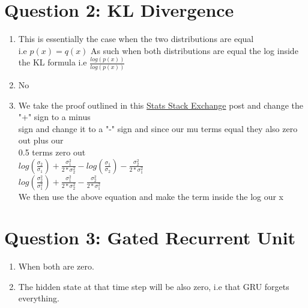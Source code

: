 \documentclass[12pt,letterpaper]{article}
\begin{document}
\section{Question 2: KL Divergence}


\begin{enumerate}

	\item This is essentially the case when the two distributions are equal 
	\\ i.e $p(x)=q(x)$ As such when both distributions are equal the log inside
	\\ the KL formula i.e $\frac{log(p(x))}{log(p(x))}$ 
	
	\item No

	\item We take the proof outlined in this \href{https://stats.stackexchange.com/questions/66271/kullback-leibler-divergence-of-two-normal-distributions?fbclid=IwAR1MGg0ZK6zeZOoYY4Sy6MWnmH1XGirg99kZOdCrfkarrLO8y9FAqG0Dsks}{Stats Stack Exchange} post and change the "+" sign to a minus
	\\ sign and change it to a "-" sign and since our mu terms equal they also zero out plus our 
	\\ 0.5 terms zero out
	\\ $log(\frac{\sigma_{2}}{\sigma_{1}})+\frac{\sigma_{1}^{2}}{2*\sigma_{2}^{2}}-log(\frac{\sigma_{1}}{\sigma_{2}})-\frac{\sigma_{2}^{2}}{2*\sigma_{1}^{2}}$
	\\ $log(\frac{\sigma_{2}^{2}}{\sigma_{1}^{2}})+ \frac{\sigma_{1}^{2}}{2*\sigma_{2}^{2}} -\frac{\sigma_{2}^{2}}{2*\sigma_{1}^{2}}$
	\\ We then use the above equation and make the term inside the log our x

\end{enumerate}

\section{Question 3: Gated Recurrent Unit}

\begin{enumerate}

\item When both are zero. 

\item The hidden state at that time step will be also zero, i.e that GRU forgets everything. 

\end{enumerate}
\end{document}
